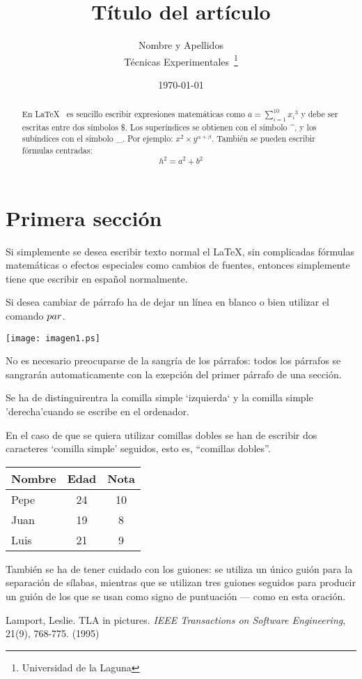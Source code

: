 \documentclass[a4paper,12pt]{article}
\begin{document}
\title{Título del artículo}
\author{Nombre y Apellidos \\
        Técnicas Experimentales~\footnote{Universidad de la Laguna}
        }
\date{\today}
\maketitle
\begin{abstract}
  En \LaTeX{}~\cite{Lam:86} es sencillo escribir expresiones
  matemáticas como $a=\sum_{i=1}^{10} {x_i}^{3}$
  y debe ser escritas entre dos símbolos \$.
  Los superíndices se obtienen con el símbolo \^{}, y
  los subíndices con el símbolo \_.
  Por ejemplo: $x^2 \times y^{\alpha + \beta}$.
  También se pueden escribir fórmulas centradas:
  \[h^2=a^2 + b^2 \]
\end{abstract}

\section{Primera sección}
Si simplemente se desea escribir texto normal el LaTeX,
sin complicadas f\'ormulas matem\'aticas o efectos especiales
como cambios de fuentes, entonces simplemente tiene que escribir
en espa\~nol normalmente.\par
Si desea cambiar de párrafo ha de dejar un línea en blanco o bien
utilizar el comando $\\par$.

\texttt{[image: imagen1.ps]}

No es necesario preocuparse de la sangría de los párrafos:
todos los párrafos se sangrarán automaticamente con la exepción
del primer párrafo de una sección.

Se ha de distinguirentra la comilla simple `izquierda`
y la comilla simple 'derecha'cuando se escribe en el ordenador.

En el caso de que se quiera utilizar comillas dobles se han de
escribir dos caracteres `comilla simple' seguidos, esto es,
``comillas dobles''. 

\bigskip
\begin{tabular}{|l|c|c|}
\hline
Nombre & Edad & Nota \\ \hline
Pepe & 24 & 10 \\ \hline
Juan & 19 & 8 \\ \hline
Luis & 21 & 9 \\ \hline
\end{tabular}


También se ha de tener cuidado con los guiones: se utiliza un único
guión para la separación de sílabas, mientras que se utilizan
tres guiones seguidos para producir un guión de los que se usan
como signo de puntuación --- como en esta oración.

\begin{thebibliography}{00}
    Lamport, Leslie.
    TLA in pictures.
    \emph{IEEE Transactions on Software Engineering},
    21(9), 768-775.
    (1995)
\end{thebibliography}
\end{document}
